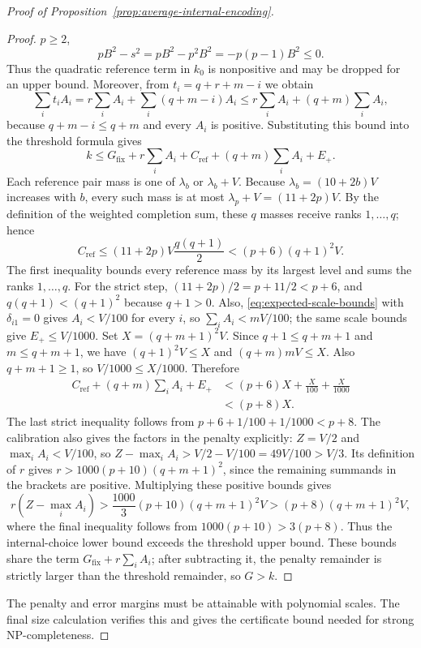 \begin{proof}[Proof of Proposition~\ref{prop:average-internal-encoding}]
\begin{proof}
$p\ge2$,
\[
 pB^2-s^2=pB^2-p^2B^2=-p(p-1)B^2\le0.
\]
Thus the quadratic reference term in $k_0$ is nonpositive and may be
dropped for an upper bound. Moreover, from $t_i=q+r+m-i$ we obtain
\[
 \sum_i t_iA_i
 =r\sum_iA_i+\sum_i(q+m-i)A_i
 \le r\sum_iA_i+(q+m)\sum_iA_i,
\]
because $q+m-i\le q+m$ and every $A_i$ is positive. Substituting this
bound into the threshold formula gives
\[
 k\le G_{\mathrm{fix}}+r\sum_i A_i+
           C_{\mathrm{ref}}+(q+m)\sum_i A_i+E_+.
\]
Each reference pair mass is one of $\lambda_b$ or $\lambda_b+V$.
Because $\lambda_b=(10+2b)V$ increases with $b$, every such mass is at
most $\lambda_p+V=(11+2p)V$. By the definition of the weighted
completion sum, these $q$ masses receive ranks $1,\ldots,q$; hence
\[
 C_{\mathrm{ref}}
 \le(11+2p)V\frac{q(q+1)}2
 <(p+6)(q+1)^2V.
\]
The first inequality bounds every reference mass by its largest
level and sums the ranks $1,\ldots,q$. For the strict step,
$(11+2p)/2=p+11/2<p+6$, and $q(q+1)<(q+1)^2$ because $q+1>0$.
Also, \eqref{eq:expected-scale-bounds} with $\delta_{i1}=0$ gives
$A_i<V/100$ for every $i$, so $\sum_iA_i<mV/100$; the same scale
bounds give $E_+\le V/1000$. Set $X=(q+m+1)^2V$. Since
$q+1\le q+m+1$ and $m\le q+m+1$, we have
$(q+1)^2V\le X$ and $(q+m)mV\le X$. Also $q+m+1\ge1$, so
$V/1000\le X/1000$. Therefore
\begin{align*}
 C_{\mathrm{ref}}+(q+m)\sum_iA_i+E_+
 &<(p+6)X+\frac X{100}+\frac X{1000}\\
 &<(p+8)X.
\end{align*}
The last strict inequality follows from
$p+6+1/100+1/1000<p+8$.
The calibration also gives the factors in the penalty explicitly:
$Z=V/2$ and $\max_iA_i<V/100$, so
$Z-\max_iA_i>V/2-V/100=49V/100>V/3$. Its definition of $r$ gives
$r>1000(p+10)(q+m+1)^2$, since the remaining summands in the
brackets are positive. Multiplying these positive bounds gives
\[
 r(Z-\max_iA_i)>
 \frac{1000}{3}(p+10)(q+m+1)^2V
 >(p+8)(q+m+1)^2V,
\]
where the final inequality follows from
$1000(p+10)>3(p+8)$. Thus the internal-choice lower bound exceeds
the threshold upper bound. These bounds share the term
$G_{\mathrm{fix}}+r\sum_iA_i$; after subtracting it, the penalty
remainder is strictly larger than the threshold remainder, so $G>k$.
\end{proof}
The penalty and error margins must be attainable with polynomial
scales. The final size calculation verifies this and gives the
certificate bound needed for strong NP-completeness.


\end{proof}
